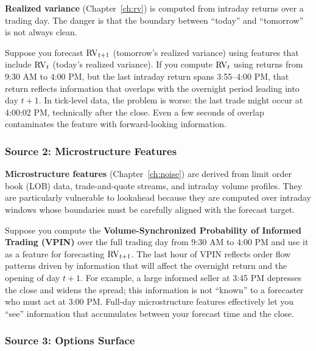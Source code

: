 \textbf{Realized variance} (Chapter~\ref{ch:rv}) is computed from intraday returns over a trading day.
The danger is that the boundary between ``today'' and ``tomorrow'' is not always clean.

\begin{warning}
Suppose you forecast $\operatorname{RV}_{t+1}$ (tomorrow's realized variance) using features that include $\operatorname{RV}_t$ (today's realized variance).
If you compute $\operatorname{RV}_t$ using returns from 9:30 AM to 4:00 PM, but the last intraday return spans 3:55--4:00 PM, that return reflects information that overlaps with the overnight period leading into day $t+1$.
In tick-level data, the problem is worse: the last trade might occur at 4:00:02 PM, technically after the close.
Even a few seconds of overlap contaminates the feature with forward-looking information.
\end{warning}

\subsubsection{Source 2: Microstructure Features}

\textbf{Microstructure features} (Chapter~\ref{ch:noise}) are derived from limit order book (LOB) data, trade-and-quote streams, and intraday volume profiles.
They are particularly vulnerable to lookahead because they are computed over intraday windows whose boundaries must be carefully aligned with the forecast target.

\begin{warning}
Suppose you compute the \textbf{Volume-Synchronized Probability of Informed Trading (VPIN)} over the full trading day from 9:30 AM to 4:00 PM and use it as a feature for forecasting $\operatorname{RV}_{t+1}$.
The last hour of VPIN reflects order flow patterns driven by information that will affect the overnight return and the opening of day $t+1$.
For example, a large informed seller at 3:45 PM depresses the close and widens the spread; this information is not ``known'' to a forecaster who must act at 3:00 PM.
Full-day microstructure features effectively let you ``see'' information that accumulates between your forecast time and the close.
\end{warning}

\subsubsection{Source 3: Options Surface}

